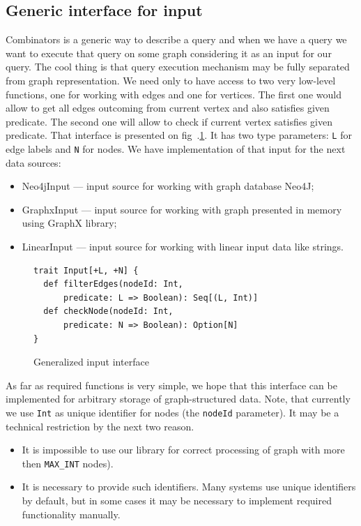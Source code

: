 \subsection{Generic interface for input}
Combinators is a generic way to describe a query and when we have a query we want to execute that query on some graph considering it as an input for our query.
The cool thing is that query execution mechanism may be fully separated from graph representation.
We need only to have access to two very low-level functions, one for working with edges and one for vertices. 
The first one would allow to get all edges outcoming from current vertex and also satisfies given predicate. 
The second one will allow to check if current vertex satisfies given predicate.
That interface is presented on fig~.\ref{fig:input}.
It has two type parameters: \lstinline{L} for edge labels and \lstinline{N} for nodes.
We have implementation of that input for the next data sources: 

\begin{itemize}
    \item Neo4jInput --- input source for working with graph database Neo4J;
    \item GraphxInput --- input source for working with graph presented in memory using GraphX library;
    \item LinearInput --- input source for working with linear input data like strings.
\end{itemize}

\begin{figure}[h]
\begin{lstlisting}
trait Input[+L, +N] {
  def filterEdges(nodeId: Int, 
      predicate: L => Boolean): Seq[(L, Int)]
  def checkNode(nodeId: Int, 
      predicate: N => Boolean): Option[N]
}

\end{lstlisting}
\caption{Generalized input interface}
\label{fig:input}
\end{figure}

As far as required functions is very simple, we hope that this interface can be implemented for arbitrary storage of graph-structured data.
Note, that currently we use \lstinline{Int} as unique identifier for nodes (the \lstinline{nodeId} parameter).
It may be a technical restriction by the next two reason.
\begin{itemize}
\item It is impossible to use our library for correct processing of graph with more then \lstinline{MAX_INT} nodes). 
\item It is necessary to provide such identifiers. Many systems use unique identifiers by default, but in some cases it may be necessary to implement required functionality manually.
\end{itemize}




